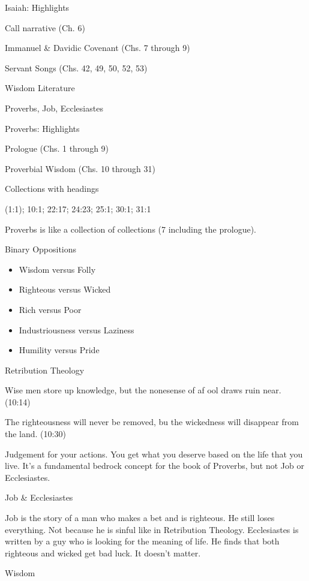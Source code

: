 \documentclass{article}
\begin{document}
    \centerline{Isaiah: Highlights}

    Call narrative (Ch. 6)

    Immanuel \& Davidic Covenant (Chs. 7 through 9)

    Servant Songs (Chs. 42, 49, 50, 52, 53)

    \centerline{Wisdom Literature}

    Proverbs, Job, Ecclesiastes

    \centerline{Proverbs: Highlights}

    Prologue (Chs. 1 through 9)

    Proverbial Wisdom (Chs. 10 through 31)

    Collections with headings

    (1:1); 10:1; 22:17; 24:23; 25:1; 30:1; 31:1

    Proverbs is like a collection of collections (7 including the prologue).

    Binary Oppositions

    \begin{itemize}
        \item Wisdom versus Folly
        \item Righteous versus Wicked
        \item Rich versus Poor
        \item Industriousness versus Laziness
        \item Humility versus Pride
    \end{itemize}

    Retribution Theology

    Wise men store up knowledge, but the nonesense of af ool draws ruin near. (10:14)

    The righteousness will never be removed, bu the wickedness will disappear from the land. (10:30)

    Judgement for your actions. You get what you deserve based on the life that you live. It's a fundamental bedrock concept for the book of Proverbs, but not Job or Ecclesiastes.

    \centerline{Job \& Ecclesiastes}

    Job is the story of a man who makes a bet and is righteous. He still loses everything. Not because he is sinful like in Retribution Theology. Ecclesiastes is written by a guy who is looking for the meaning of life. He finds that both righteous and wicked get bad luck. It doesn't matter.

    \centerline{Wisdom}
\end{document}
